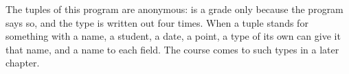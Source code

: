 The tuples of this program are anonymous:  is a grade only
because the program says so, and the type \token{[([c8], i32)]} is written out
four times. When a tuple stands for something with a name, a student, a date, a
point, a type of its own can give it that name, and a name to each field. The
course comes to such types in a later chapter.
